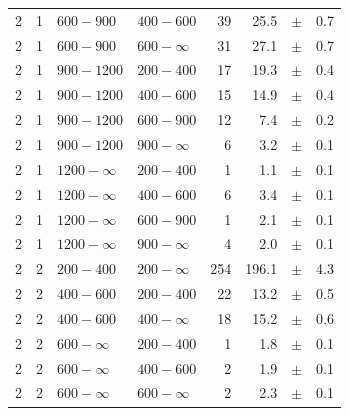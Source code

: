 \begin{table}[!h]
\begin{tabular}{rrllrrcl}
2 & 1 & $ 600- 900$ & $400-600$ &     39 &     25.5 &$\pm$&    0.7 \\
2 & 1 & $ 600- 900$ & $600-\infty$ &     31 &     27.1 &$\pm$&    0.7 \\
2\T & 1 & $ 900-1200$ & $200-400$ &     17 &     19.3 &$\pm$&    0.4 \\
2 & 1 & $ 900-1200$ & $400-600$ &     15 &     14.9 &$\pm$&    0.4 \\
2 & 1 & $ 900-1200$ & $600-900$ &     12 &      7.4 &$\pm$&    0.2 \\
2 & 1 & $ 900-1200$ & $900-\infty$ &      6 &      3.2 &$\pm$&    0.1 \\
2\T & 1 & $1200- \infty$ & $200-400$ &      1 &      1.1 &$\pm$&    0.1 \\
2 & 1 & $1200- \infty$ & $400-600$ &      6 &      3.4 &$\pm$&    0.1 \\
2 & 1 & $1200- \infty$ & $600-900$ &      1 &      2.1 &$\pm$&    0.1 \\
2 & 1 & $1200- \infty$ & $900-\infty$ &      4 &      2.0 &$\pm$&    0.1 \\
2\T & 2 & $ 200- 400$ & $200-\infty$ &    254 &    196.1 &$\pm$&    4.3 \\
2\T & 2 & $ 400- 600$ & $200-400$ &     22 &     13.2 &$\pm$&    0.5 \\
2 & 2 & $ 400- 600$ & $400-\infty$ &     18 &     15.2 &$\pm$&    0.6 \\
2\T & 2 & $ 600- \infty$ & $200-400$ &      1 &      1.8 &$\pm$&    0.1 \\
2 & 2 & $ 600- \infty$ & $400-600$ &      2 &      1.9 &$\pm$&    0.1 \\
2 & 2 & $ 600- \infty$ & $600-\infty$ &      2 &      2.3 &$\pm$&    0.1 \\
    \hline
  \end{tabular}
\end{table}

